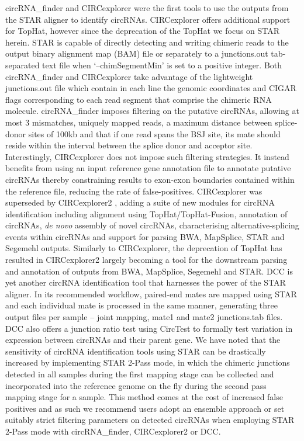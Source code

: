 \documentclass[journal,review,submit,pdftex,moreauthors]{Definitions/mdpi}
\begin{document}
circRNA\_finder \cite{circRNA_finder} and CIRCexplorer \cite{CIRCexplorer} were the first tools to use the outputs from the STAR aligner to identify circRNAs. CIRCexplorer offers additional support for TopHat, however since the deprecation of the TopHat we focus on STAR herein. STAR is capable of directly detecting and writing chimeric reads to the output binary alignment map (BAM) file or separately to a junctions.out tab-separated text file when `--chimSegmentMin' is set to a positive integer. Both circRNA\_finder and CIRCexplorer take advantage of the lightweight junctions.out file which contain in each line the genomic coordinates and CIGAR flags corresponding to each read segment that comprise the chimeric RNA molecule. circRNA\_finder imposes filtering on the putative circRNAs, allowing at most 3 mismatches, uniquely mapped reads, a maximum distance between splice-donor sites of 100kb and that if one read spans the BSJ site, its mate should reside within the interval between the splice donor and acceptor site. Interestingly, CIRCexplorer does not impose such filtering strategies. It instead benefits from using an input reference gene annotation file to annotate putative circRNAs thereby constraining results to exon-exon boundaries contained within the reference file, reducing the rate of false-positives. CIRCexplorer was superseded by CIRCexplorer2 \cite{CIRCexplorer2}, adding a suite of new modules for circRNA identification including alignment using TopHat/TopHat-Fusion, annotation of circRNAs, \textit{de novo} assembly of novel circRNAs, characterising alternative-splicing events within circRNAs and support for parsing BWA, MapSplice, STAR and Segemehl outputs. Similarly to CIRCexplorer, the deprecation of TopHat has resulted in CIRCexplorer2 largely becoming a tool for the downstream parsing and annotation of outputs from BWA, MapSplice, Segemehl and STAR. DCC \cite{DCC} is yet another circRNA identification tool that harnesses the power of the STAR aligner. In its recommended workflow, paired-end mates are mapped using STAR and each individual mate is processed in the same manner, generating three output files per sample -- joint mapping, mate1 and mate2 junctions.tab files. DCC also offers a junction ratio test using CircTest to formally test variation in expression between circRNAs and their parent gene. We have noted that the sensitivity of circRNA identification tools using STAR can be drastically increased by implementing STAR 2-Pass mode, in which the chimeric junctions detected in all samples during the first mapping stage can be collected and incorporated into the reference genome on the fly during the second pass mapping stage for a sample. This method comes at the cost of increased false positives \cite{Engstrom2013Dec} and as such we recommend users adopt an ensemble approach or set suitably strict filtering parameters on detected circRNAs when employing STAR 2-Pass mode with circRNA\_finder, CIRCexplorer2 or DCC. \par
\end{document}

